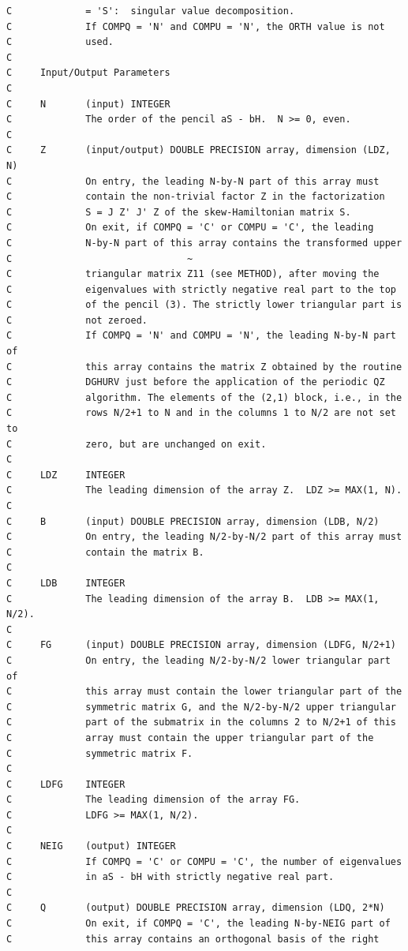 \documentclass[a4paper,10pt]{article}
\begin{document}
\begin{verbatim}
C             = 'S':  singular value decomposition.
C             If COMPQ = 'N' and COMPU = 'N', the ORTH value is not
C             used.
C
C     Input/Output Parameters
C
C     N       (input) INTEGER
C             The order of the pencil aS - bH.  N >= 0, even.
C
C     Z       (input/output) DOUBLE PRECISION array, dimension (LDZ, N)
C             On entry, the leading N-by-N part of this array must
C             contain the non-trivial factor Z in the factorization
C             S = J Z' J' Z of the skew-Hamiltonian matrix S.
C             On exit, if COMPQ = 'C' or COMPU = 'C', the leading
C             N-by-N part of this array contains the transformed upper
C                               ~
C             triangular matrix Z11 (see METHOD), after moving the
C             eigenvalues with strictly negative real part to the top
C             of the pencil (3). The strictly lower triangular part is
C             not zeroed.
C             If COMPQ = 'N' and COMPU = 'N', the leading N-by-N part of
C             this array contains the matrix Z obtained by the routine
C             DGHURV just before the application of the periodic QZ
C             algorithm. The elements of the (2,1) block, i.e., in the
C             rows N/2+1 to N and in the columns 1 to N/2 are not set to
C             zero, but are unchanged on exit.
C
C     LDZ     INTEGER
C             The leading dimension of the array Z.  LDZ >= MAX(1, N).
C
C     B       (input) DOUBLE PRECISION array, dimension (LDB, N/2)
C             On entry, the leading N/2-by-N/2 part of this array must
C             contain the matrix B.
C
C     LDB     INTEGER
C             The leading dimension of the array B.  LDB >= MAX(1, N/2).
C
C     FG      (input) DOUBLE PRECISION array, dimension (LDFG, N/2+1)
C             On entry, the leading N/2-by-N/2 lower triangular part of
C             this array must contain the lower triangular part of the
C             symmetric matrix G, and the N/2-by-N/2 upper triangular
C             part of the submatrix in the columns 2 to N/2+1 of this
C             array must contain the upper triangular part of the
C             symmetric matrix F.
C
C     LDFG    INTEGER
C             The leading dimension of the array FG.
C             LDFG >= MAX(1, N/2).
C
C     NEIG    (output) INTEGER
C             If COMPQ = 'C' or COMPU = 'C', the number of eigenvalues
C             in aS - bH with strictly negative real part.
C
C     Q       (output) DOUBLE PRECISION array, dimension (LDQ, 2*N)
C             On exit, if COMPQ = 'C', the leading N-by-NEIG part of
C             this array contains an orthogonal basis of the right

\end{verbatim}
\end{document}
